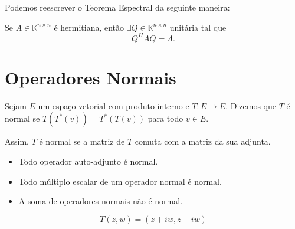 
Podemos reescrever o Teorema Espectral da seguinte maneira:

Se $A\in {\mathbb{K}}^{n\times n}$ é hermitiana, então $\exists Q\in {\mathbb{K}}^{n\times n}$ unitária tal que
\begin{equation*}
	Q^HAQ=\Lambda.
\end{equation*}

\section{Operadores Normais}

\begin{defi}
Sejam $E$ um espaço vetorial com produto interno e $T:E\to E$. Dizemos que $T$ é normal se $T(T^*(v))=T^*(T(v))$ para todo $v\in E$.
\end{defi}

Assim, $T$ é normal se a matriz de $T$ comuta com a matriz da sua adjunta.

\begin{itemize}
	\item Todo operador auto-adjunto é normal.
    \item Todo múltiplo escalar de um operador normal é normal.
    \item A soma de operadores normais não é normal. 
\end{itemize}

\begin{exemplo}
$$	T(z,w)=(z+iw,z-iw)$$
\end{exemplo}

